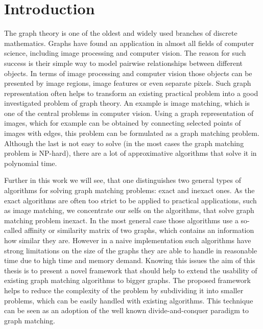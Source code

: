 \chapter{Introduction}
The graph theory is one of the oldest and widely used branches of discrete mathematics. Graphs have found an application in almost all fields of computer science, including image processing and computer vision. The reason for such success is their simple way to model pairwise relationships between different objects. In terms of image processing and computer vision those objects can be presented by image regions, image features or even separate pixels. Such graph representation often helps to transform an existing practical problem into a good investigated problem of graph theory. An example is image matching, which is one of the central problems in computer vision. %
Using a graph representation of images, which for example can be obtained by connecting selected points of images with edges, this problem can be formulated as a graph matching problem. Although the last is not easy to solve (in the most cases the graph matching problem is NP-hard), there are a lot of approximative algorithms that solve it in polynomial time.

Further in this work we will see, that one distinguishes two general types of algorithms for solving graph matching problems: exact and inexact ones. As the exact algorithms are often too strict to be applied to practical applications, such as image matching, we concentrate our selfs on the algorithms, that solve graph matching problem inexact.
In the most general case those algorithms use a so-called affinity or similarity matrix of two graphs, which contains an information how similar they are.
However in a naive implementation such algorithms have strong limitations on the size of the graphs they are able to handle in reasonable time due to high time and memory demand. Knowing this issues the aim of this thesis is to present a novel framework that should help to extend the usability of existing graph matching algorithms to bigger graphs. The proposed framework helps to reduce the complexity of the problem by subdividing it into smaller problems, which can be easily handled with existing algorithms. This technique can be seen as an adoption of the well known divide-and-conquer paradigm to graph matching.

